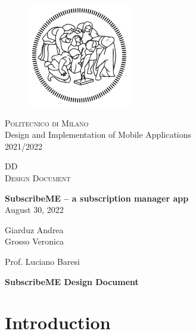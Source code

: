 \documentclass[11pt]{article}
\begin{document}
\begin{titlepage}
    \begin{center}
        \vspace*{1cm}
        \begin{figure}[h]
            \begin{center}
                \includegraphics[width=4.5cm, clip]{../../assets/logo.png}
            \end{center}
            \label{title:logo}
        \end{figure}
        \vspace*{1cm}
        \LARGE{{\scshape Politecnico di Milano}}
        \\
        \LARGE{Design and Implementation of Mobile Applications}
        \\
        \LARGE{2021/2022}

        \vspace*{1.5cm}
        \Huge{DD}
        \\
        \Large{{\scshape Design Document}}

        \vspace{1.5cm}

        \LARGE{\textbf{SubscribeME -- a subscription manager app}}
        \\
        \vspace{1cm}
        \Large{August 30, 2022}
        \vfill

        \Large{Giarduz Andrea\\
            Grosso Veronica
        }

        \vspace{0.8cm}

        \Large
        Prof. Luciano Baresi
    \end{center}
\end{titlepage}
\tableofcontents

\newpage
\begin{center}
    \LARGE{\textbf{SubscribeME Design Document}}
\end{center}
\section{Introduction}\label{sec:intro}
\end{document}
